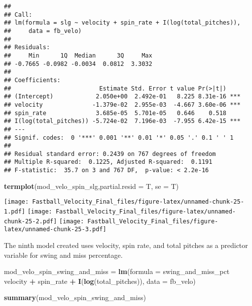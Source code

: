\documentclass[]{article}
\newenvironment{Shaded}{\begin{snugshade}}{\end{snugshade}}
\newcommand{\KeywordTok}[1]{\textcolor[rgb]{0.13,0.29,0.53}{\textbf{#1}}}
\newcommand{\DataTypeTok}[1]{\textcolor[rgb]{0.13,0.29,0.53}{#1}}
\newcommand{\StringTok}[1]{\textcolor[rgb]{0.31,0.60,0.02}{#1}}
\newcommand{\OperatorTok}[1]{\textcolor[rgb]{0.81,0.36,0.00}{\textbf{#1}}}
\newcommand{\NormalTok}[1]{#1}
\begin{document}
\begin{verbatim}
## 
## Call:
## lm(formula = slg ~ velocity + spin_rate + I(log(total_pitches)), 
##     data = fb_velo)
## 
## Residuals:
##     Min      1Q  Median      3Q     Max 
## -0.7665 -0.0982 -0.0034  0.0812  3.3032 
## 
## Coefficients:
##                         Estimate Std. Error t value Pr(>|t|)    
## (Intercept)            2.050e+00  2.492e-01   8.225 8.31e-16 ***
## velocity              -1.379e-02  2.955e-03  -4.667 3.60e-06 ***
## spin_rate              3.685e-05  5.701e-05   0.646    0.518    
## I(log(total_pitches)) -5.724e-02  7.196e-03  -7.955 6.42e-15 ***
## ---
## Signif. codes:  0 '***' 0.001 '**' 0.01 '*' 0.05 '.' 0.1 ' ' 1
## 
## Residual standard error: 0.2439 on 767 degrees of freedom
## Multiple R-squared:  0.1225, Adjusted R-squared:  0.1191 
## F-statistic:  35.7 on 3 and 767 DF,  p-value: < 2.2e-16
\end{verbatim}

\begin{Shaded}
\begin{Highlighting}[]
\KeywordTok{termplot}\NormalTok{(mod_velo_spin_slg,}\DataTypeTok{partial.resid =}\NormalTok{ T, }\DataTypeTok{se =}\NormalTok{ T)}
\end{Highlighting}
\end{Shaded}

\texttt{[image: Fastball\_Velocity\_Final\_files/figure-latex/unnamed-chunk-25-1.pdf]}
\texttt{[image: Fastball\_Velocity\_Final\_files/figure-latex/unnamed-chunk-25-2.pdf]}
\texttt{[image: Fastball\_Velocity\_Final\_files/figure-latex/unnamed-chunk-25-3.pdf]}

The ninth model created uses velocity, spin rate, and total pitches as a
predictor variable for swing and miss percentage.

\begin{Shaded}
\begin{Highlighting}[]
\NormalTok{mod_velo_spin_swing_and_miss =}\StringTok{ }\KeywordTok{lm}\NormalTok{(}\DataTypeTok{formula =}\NormalTok{ swing_and_miss_pct }\OperatorTok{~}\StringTok{ }\NormalTok{velocity }\OperatorTok{+}\StringTok{ }\NormalTok{spin_rate }\OperatorTok{+}\StringTok{ }\KeywordTok{I}\NormalTok{(}\KeywordTok{log}\NormalTok{(total_pitches)), }\DataTypeTok{data =}\NormalTok{ fb_velo)}
\end{Highlighting}
\end{Shaded}

\begin{Shaded}
\begin{Highlighting}[]
\KeywordTok{summary}\NormalTok{(mod_velo_spin_swing_and_miss)}
\end{Highlighting}
\end{Shaded}
\end{document}
